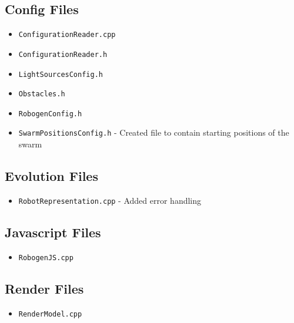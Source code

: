 \documentclass[11pt,a4paper]{article}
\begin{document}
\subsection{Config Files}
\begin{itemize}
    \item \texttt{ConfigurationReader.cpp}
    \item \texttt{ConfigurationReader.h}
    \item \texttt{LightSourcesConfig.h}
    \item \texttt{Obstacles.h}
    \item \texttt{RobogenConfig.h}
    \item \texttt{SwarmPositionsConfig.h} - Created file to contain starting
        positions of the swarm
\end{itemize}

\subsection{Evolution Files}
\begin{itemize}
    \item \texttt{RobotRepresentation.cpp} - Added error handling
\end{itemize}

\subsection{Javascript Files}
\begin{itemize}
    \item \texttt{RobogenJS.cpp}
\end{itemize}

\subsection{Render Files}
\begin{itemize}
    \item \texttt{RenderModel.cpp}
\end{itemize}
\end{document}
